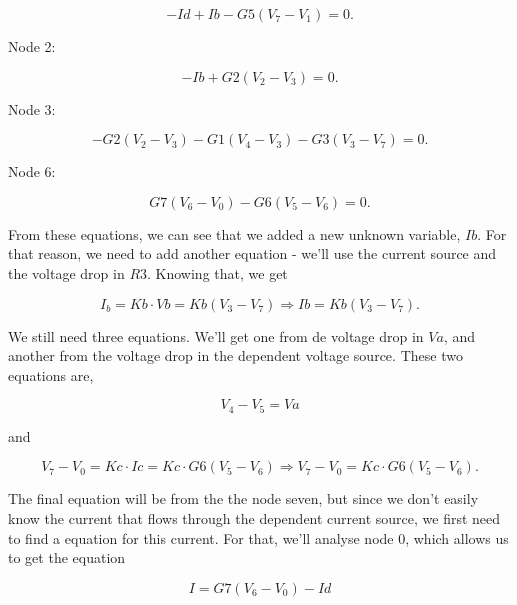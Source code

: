  \begin{equation}
  -Id + Ib - G5(V_7-V_1) = 0.
  \label{eq:N1}
\end{equation}

Node 2:

 \begin{equation}
  -Ib + G2(V_2-V_3) = 0.
  \label{eq:N2}
\end{equation}

Node 3:

 \begin{equation}
  -G2(V_2-V_3)-G1(V_4-V_3)-G3(V_3-V_7) = 0.
  \label{eq:N3}
\end{equation}

Node 6:

 \begin{equation}
  G7(V_6-V_0)-G6(V_5-V_6) = 0.
  \label{eq:N6}
\end{equation}

\par From these equations, we can see that we added a new unknown variable, $Ib$. For that reason, we need to add another equation - we'll use the current source and the voltage drop in $R3$. Knowing that, we get

 \begin{equation}
  I_b = Kb \cdot Vb = Kb(V_3-V_7) \Rightarrow Ib = Kb(V_3-V_7).
  \label{eq:Ib}
\end{equation}

\par We still need three equations. We'll get one from de voltage drop in $Va$, and another from the voltage drop in the dependent voltage source. These two equations are,

  \begin{equation}
  V_4-V_5 = Va
  \label{eq:Va}
\end{equation}

and

 \begin{equation}
  V_7-V_0 = Kc \cdot Ic = Kc\cdot G6(V_5-V_6) \Rightarrow V_7-V_0 = Kc\cdot G6(V_5-V_6).
  \label{eq:Vc}
\end{equation}

\par The final equation will be from the the node seven, but since we don't easily know the current that flows through the dependent current source, we first need to find a equation for this current. For that, we'll analyse node 0, which allows us to get the equation

 \begin{equation}
  I = G7(V_6-V_0) - Id
  \label{eq:corrente}
\end{equation}

